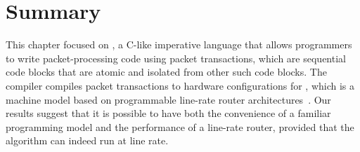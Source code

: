 \section{Summary}
\label{s:domino_summary}

This chapter focused on \pktlanguage, a C-like imperative language that allows
programmers to write packet-processing code using packet transactions, which
are sequential code blocks that are atomic and isolated from other such code
blocks. The \pktlanguage compiler compiles packet transactions to hardware
configurations for \absmachine, which is a machine model based on programmable
line-rate router architectures~\cite{flexpipe, xpliant, tofino}. Our results
suggest that it is possible to have both the convenience of a familiar
programming model and the performance of a line-rate router, provided that the
algorithm can indeed run at line rate.
